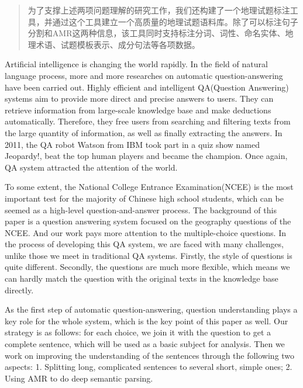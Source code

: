 \documentclass[master, winfont]{njuthesis}
\begin{document}
\begin{abstract}
为了支撑上述两项问题理解的研究工作，我们还构建了一个地理试题标注工具，并通过这个工具建立一个高质量的地理试题语料库。除了可以标注句子分割和AMR这两种信息，该工具同时支持标注分词、词性、命名实体、地理术语、试题模板表示、成分句法等各项数据。

\end{abstract}

\begin{englishabstract}
Artificial intelligence is changing the world rapidly. In the field of natural language process, more and more researches on automatic question-answering have been carried out. Highly efficient and intelligent QA(Question Answering) systems aim to provide more direct and precise answers to users. They can retrieve information from large-scale knowledge base and make deductions automatically. Therefore, they free users from searching and filtering texts from the large quantity of information, as well as finally extracting the answers. In 2011, the QA robot Watson from IBM took part in a quiz show named Jeopardy!, beat the top human players and became the champion. Once again, QA system attracted the attention of the world.

To some extent, the National College Entrance Examination(NCEE) is the most important test for the majority of Chinese high school students, which can be seemed as a high-level question-and-answer process. The background of this paper is a question answering system focused on the geography questions of the NCEE. And our work pays more attention to the multiple-choice questions. In the process of developing this QA system, we are faced with many challenges, unlike those we meet in traditional QA systems. Firstly, the style of questions is quite different. Secondly, the questions are much more flexible, which means we can hardly match the question with the original texts in the knowledge base directly.

As the first step of automatic question-answering, question understanding plays a key role for the whole system, which is the key point of this paper as well. Our strategy is as follows: for each choice, we join it with the question to get a complete sentence, which will be used as a basic subject for analysis. Then we work on improving the understanding of the sentences through the following two aspects: 1. Splitting long, complicated sentences to several short, simple ones; 2. Using AMR to do deep semantic parsing. 


\end{englishabstract}
\end{document}
